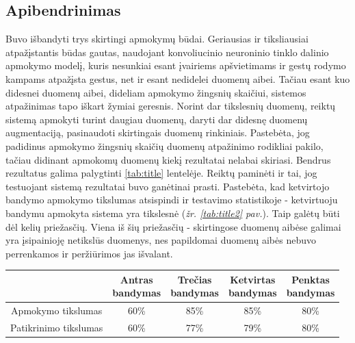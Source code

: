 \documentclass{VUMIFInfKursinis}
\begin{document}
\subsection{Apibendrinimas}
Buvo išbandyti trys skirtingi apmokymų būdai. Geriausias ir tiksliausiai atpažįstantis būdas gautas, naudojant konvoliucinio neuroninio tinklo dalinio apmokymo modelį, kuris nesunkiai esant įvairiems apšvietimams ir gestų rodymo kampams atpažįsta gestus, net ir esant nedidelei duomenų aibei. Tačiau esant kuo didesnei duomenų aibei, dideliam apmokymo žingsnių skaičiui, sistemos atpažinimas tapo iškart žymiai geresnis. Norint dar tikslesnių duomenų, reiktų sistemą apmokyti turint daugiau duomenų, daryti dar didesnę duomenų augmentaciją, pasinaudoti skirtingais duomenų rinkiniais. Pastebėta, jog padidinus apmokymo žingsnių skaičių duomenų atpažinimo rodikliai pakilo, tačiau didinant apmokomų duomenų kiekį rezultatai nelabai skiriasi. Bendrus rezultatus galima palygtinti \ref{tab:title} lentelėje. Reiktų paminėti ir tai, jog testuojant sistemą rezultatai buvo ganėtinai prasti. Pastebėta, kad ketvirtojo bandymo apmokymo tikslumas atsispindi ir testavimo statistikoje - ketvirtuoju bandymu apmokyta sistema yra tikslesnė (\textit{žr. \ref{tab:title2} pav.}). Taip galėtų būti dėl kelių priežasčių. Viena iš šių priežasčių - skirtingose duomenų aibėse galimai yra įsipainioję netikslūs duomenys, nes papildomai duomenų aibės nebuvo perrenkamos ir peržiūrimos jas išvalant.

   
   
\vspace{\baselineskip}
\begin{minipage}{\linewidth}
	\centering
	 \label{tab:title} 
	\begin{tabular}{ |c|c|c|c|c| } 
		\hline
		 & \thead{Antras\\bandymas} & \thead{Trečias\\bandymas} & \thead{Ketvirtas\\bandymas} & \thead{Penktas\\bandymas} \\
		\hline
		Apmokymo tikslumas & 60\% & 85\% & 85\% & 80\% \\ 
		Patikrinimo tikslumas & 60\% & 77\% & 79\% & 80\% \\ 
		\hline
	\end{tabular}
\end{minipage}
\end{document}
